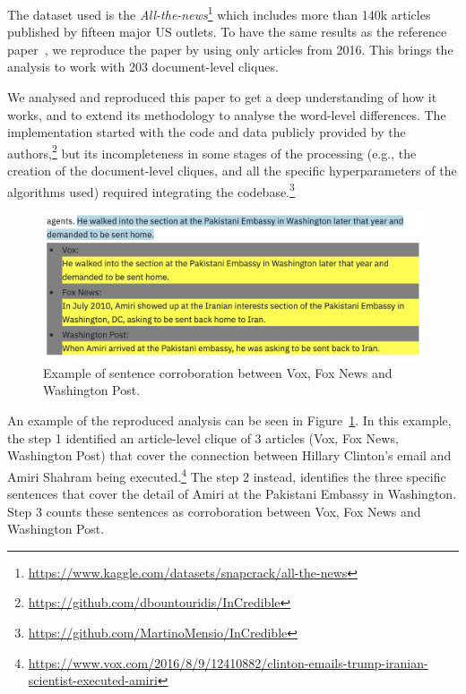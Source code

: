 The dataset used is the \emph{All-the-news}\footnote{\url{https://www.kaggle.com/datasets/snapcrack/all-the-news}} which includes more than 140k articles published by fifteen major US outlets. To have the same results as the reference paper~\citep{bountouridis2018explaining}, we reproduce the paper by using only articles from 2016. This brings the analysis to work with 203 document-level cliques. 

We analysed and reproduced this paper to get a deep understanding of how it works, and to extend its methodology to analyse the word-level differences. %
The implementation started with the code and data %
publicly provided by the authors,\footnote{\url{https://github.com/dbountouridis/InCredible}} but its incompleteness in some stages of the processing (e.g., the creation of the document-level cliques, and all the specific hyperparameters of the algorithms used) required integrating the codebase.\footnote{\url{https://github.com/MartinoMensio/InCredible}}

\begin{figure}[!htbp]
    \centering
    \includegraphics[width=\linewidth]{figures/cluster_similar_sentences_amiri.png}
    \caption{Example of sentence corroboration between Vox, Fox News and Washington Post.}
    \label{fig:cluster_similar_sentences_amiri}
\end{figure}%

An example of the reproduced analysis can be seen in Figure~\ref{fig:cluster_similar_sentences_amiri}.
In this example, the step 1 identified an article-level clique of 3 articles (Vox, Fox News, Washington Post) that cover the connection between Hillary Clinton's email and Amiri Shahram being executed.\footnote{\url{https://www.vox.com/2016/8/9/12410882/clinton-emails-trump-iranian-scientist-executed-amiri}}
The step 2 instead, identifies the three specific sentences that cover the detail of Amiri at the Pakistani Embassy in Washington.
Step 3 counts these sentences as corroboration between Vox, Fox News and Washington Post. 

